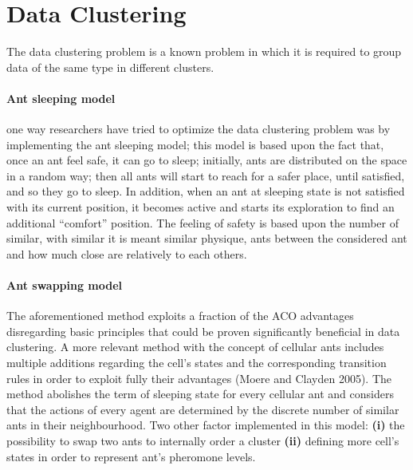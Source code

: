 \documentclass[12pt,a4paper]{report}
\begin{document}
\section{Data Clustering}
The data clustering problem is a known problem in which it is required to group data of the same type in different clusters.

\paragraph{Ant sleeping model}
one way researchers have tried to optimize the data clustering problem was by implementing the ant sleeping model; this model is based upon the fact that, once an ant feel safe, it can go to sleep; initially, ants are distributed on the space in a random way; then all ants will start to reach for a safer place, until satisfied, and so they go to sleep. In addition, when an ant at sleeping state is not satisfied with its current position, it becomes active and starts its exploration to find an additional “comfort” position. The feeling of safety is based upon the number of similar, with similar it is meant similar physique, ants between the considered ant and how much close are relatively to each others.

\paragraph{Ant swapping model}
The aforementioned method exploits a fraction of the ACO advantages disregarding basic principles that could be proven significantly beneficial in data clustering. A more relevant method with the concept of cellular ants includes multiple additions regarding the cell's states and the corresponding transition rules in order to exploit fully their advantages (Moere and Clayden 2005). The method abolishes the term of sleeping state for every cellular ant and considers that the actions of every agent are determined by the discrete number of similar ants in their neighbourhood. Two other factor implemented in this model: \textbf{(i)} the possibility to swap two ants to internally order a cluster \textbf{(ii)} defining more cell's states in order to represent ant's pheromone levels.
\end{document}
